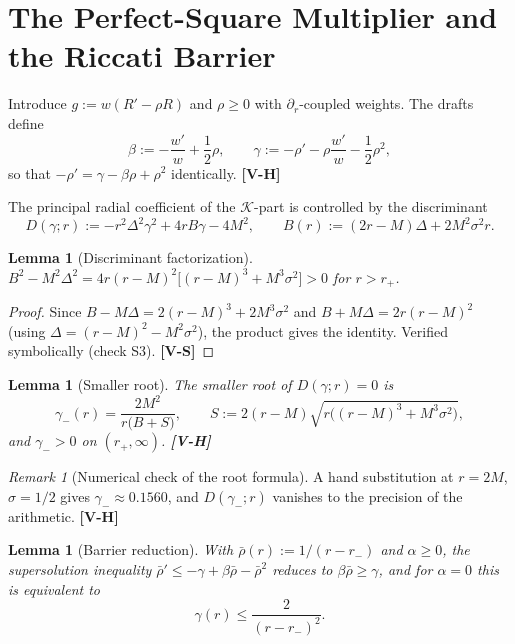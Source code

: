 \documentclass[11pt, a4paper]{article}
\newcommand{\VS}{\textcolor{vs}{\textbf{[V-S]}}}
\newcommand{\VH}{\textcolor{vh}{\textbf{[V-H]}}}
\newtheorem{lemma}[theorem]{Lemma}
\theoremstyle{remark}
\newtheorem{remark}[theorem]{Remark}
\theoremstyle{definition}
\begin{document}
\section{The Perfect-Square Multiplier and the Riccati Barrier}
\label{sec:riccati}

Introduce $g := w(R' - \rho R)$ and $\rho \ge 0$ with $\partial_r$-coupled weights. The drafts define
\[
\beta := -\frac{w'}{w} + \frac12\rho, \qquad \gamma := -\rho' - \rho\frac{w'}{w} - \frac12\rho^2,
\]
so that $-\rho' = \gamma - \beta\rho + \rho^2$ identically. \VH

The principal radial coefficient of the $\mathcal{K}$-part is controlled by the discriminant
\[
D(\gamma;r) := -r^2\Delta^2\gamma^2 + 4rB\gamma - 4M^2, \qquad B(r) := (2r-M)\Delta + 2M^2\sigma^2 r.
\]

\begin{lemma}[Discriminant factorization]
\label{lem:disc}
$B^2 - M^2\Delta^2 = 4r(r-M)^2\bigl[(r-M)^3 + M^3\sigma^2\bigr] > 0$ for $r > r_+$.
\end{lemma}

\begin{proof}
Since $B - M\Delta = 2(r-M)^3 + 2M^3\sigma^2$ and $B + M\Delta = 2r(r-M)^2$ (using $\Delta = (r-M)^2 - M^2\sigma^2$), the product gives the identity. Verified symbolically (check S3). \VS
\end{proof}

\begin{lemma}[Smaller root]
\label{lem:root}
The smaller root of $D(\gamma;r)=0$ is
\[
\gamma_-(r) = \frac{2M^2}{r\bigl(B + S\bigr)}, \qquad S := 2(r-M)\sqrt{r\bigl((r-M)^3 + M^3\sigma^2\bigr)},
\]
and $\gamma_- > 0$ on $(r_+,\infty)$. \VH
\end{lemma}

\begin{remark}[Numerical check of the root formula]
A hand substitution at $r=2M$, $\sigma=1/2$ gives $\gamma_- \approx 0.1560$, and $D(\gamma_-;r)$ vanishes to the precision of the arithmetic. \VH
\end{remark}

\begin{lemma}[Barrier reduction]
\label{lem:barrier}
With $\bar\rho(r) := 1/(r-r_-)$ and $\alpha \ge 0$, the supersolution inequality $\bar\rho' \le -\gamma + \beta\bar\rho - \bar\rho^2$ reduces to $\beta\bar\rho \ge \gamma$, and for $\alpha = 0$ this is equivalent to
\[
\gamma(r) \le \frac{2}{(r-r_-)^2}.
\]
\end{lemma}
\end{document}
